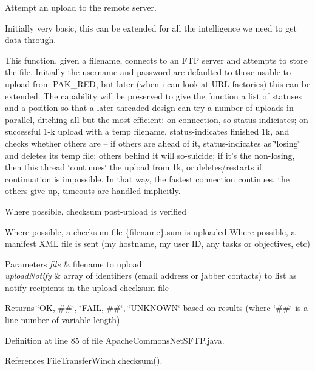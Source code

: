 Attempt an upload to the remote server. 

Initially very basic, this can be extended for all the intelligence we need to get data through.

This function, given a filename, connects to an F\+T\+P server and attempts to store the file. Initially the username and password are defaulted to those usable to upload from P\+A\+K\+\_\+\+R\+E\+D, but later (when i can look at U\+R\+L factories) this can be extended. The capability will be preserved to give the function a list of statuses and a position so that a later threaded design can try a number of uploads in parallel, ditching all but the most efficient\+: on connection, so status-\/indiciates; on successful 1-\/k upload with a temp filename, status-\/indicates finished 1k, and checks whether others are -- if others are ahead of it, status-\/indicates as \char`\"{}losing\char`\"{} and deletes its temp file; others behind it will so-\/suicide; if it's the non-\/losing, then this thread \char`\"{}continues\char`\"{} the upload from 1k, or deletes/restarts if continuation is impossible. In that way, the fastest connection continues, the others give up, timeouts are handled implicitly.

Where possible, checksum post-\/upload is verified

Where possible, a checksum file \{filename\}.sum is uploaded Where possible, a manifest X\+M\+L file is sent (my hostname, my user I\+D, any tasks or objectives, etc)


\begin{DoxyParams}{Parameters}
{\em file} & filename to upload \\
\hline
{\em upload\+Notify} & array of identifiers (email address or jabber contacts) to list as notify recipients in the upload checksum file \\
\hline
\end{DoxyParams}
\begin{DoxyReturn}{Returns}
\char`\"{}\+O\+K, \#\#\char`\"{}, \char`\"{}\+F\+A\+I\+L, \#\#\char`\"{}, \char`\"{}\+U\+N\+K\+N\+O\+W\+N\char`\"{} based on results (where \char`\"{}\#\#\char`\"{} is a line number of variable length) 
\end{DoxyReturn}


Definition at line 85 of file Apache\+Commons\+Net\+S\+F\+T\+P.\+java.



References File\+Transfer\+Winch.\+checksum().



